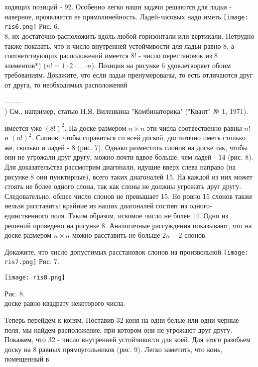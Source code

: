 \begin{multicols*}{3}
ходящих позиций - 92.
Особенно легко наши задачи решаются для ладьи - наверное, проявляется ее прямолинейность. Ладей-часовых надо иметь
\vspace{5mm}
\texttt{[image: ris6.png]}
Рис. 6. \\
8, их достаточно расположить вдоль любой горизонтали или вертикали. Нетрудно также показать, что и число внутренней устойчивости для ладьи равно 8, а соответствующих расположений имеется $8!$ - число перестановок из 8 элементов*) ($n!=1\cdot	2\cdot	...\cdot n$). Позиция на рисунке 6 удовлетворяет обоим требованиям. Докажите, что если ладьи пренумерованы, то есть отличаются друг от друга, то необходимых расположений 

-------- \\
\tiny *) См., например, статью Н.Я. Виленкина "Комбинаторика" ("Квант" № 1, 1971). 

\columnbreak

\small имеется уже $(8!)^2$. На доске размером $n\times n$ эти числа соотвественно равны $n!$ и $(n!)^2$.
Слонов, чтобы справиться со всей доской, достаточно иметь столько же, сколько и ладей - 8 (рис. 7). Однако разместить слонов на доске так, чтобы они не угрожали друг другу, можно почти вдвое больше, чем ладей - 14 (рис. 8). Для доказательства рассмотрим диагонали, идущие вверх слева направо (на рисунке 8 они пунктирные), всего таких диагоналей 15. На каждой из них может стоять не более одного слона, так как слоны не должны угрожать друг другу. Следовательно, общее число слонов не превышает 15. Но ровно 15 слонов также нельзя расставить: крайние из наших диагоналей состоят из одного-единственного поля. Таким образом, искомое число не более 14. Одно из решений приведено на рисунке 8. Аналогичные рассуждения показывают, что на доске размером $n\times n$ можно расставить не больше $2n-2$ слонов.
\columnbreak

Докажите, что число допустимых расстановок слонов на произвольной
\texttt{[image: ris7.png]}
Рис. 7.

\begin{flushleft}
\texttt{[image: ris8.png]}
\end{flushleft}
Рис. 8. \\
доске равно квадрату некоторого числа.

Теперь перейдем к коням. Поставив 32 коня на одни белые или одни черные поля, мы найдем расположение, при котором они не угрожают друг другу. Покажем, что 32 - число внутренней устойчивости для коей. Для этого разобьем доску на 8 равных прямоугольников (рис. 9). Легко заметить, что конь, помещенный в
\end{multicols*}